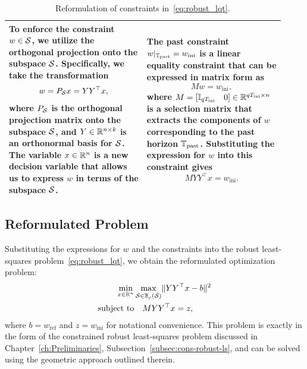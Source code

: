 \begin{table}[h]
    \centering
    \begin{tabular}{p{0.46\linewidth} p{0.46\linewidth}}
        To enforce the constraint $w \in \mathcal{S}$, we utilize the orthogonal projection onto the subspace $\mathcal{S}$. Specifically, we take the transformation
        \begin{equation}
            w = P_{\mathcal{S}} x = YY^\top x,
        \end{equation}
        where $P_{\mathcal{S}}$ is the orthogonal projection matrix onto the subspace $\mathcal{S}$, and $Y \in \mathbb{R}^{n \times k}$ is an orthonormal basis for $\mathcal{S}$. The variable $x \in \mathbb{R}^n$ is a new decision variable that allows us to express $w$ in terms of the subspace $\mathcal{S}$. & The past constraint $w|_{\mathbb{T}_{\textrm{past}}} = w_{\textrm{ini}}$ is a linear equality constraint that can be expressed in matrix form as
        \begin{equation}
            M w = w_{\textrm{ini}},
        \end{equation}
        where $M = [\mathbb{I}_{q T_{\textrm{ini}}} \quad 0] \in \mathbb{R}^{q T_{\textrm{ini}} \times n}$ is a selection matrix that extracts the components of $w$ corresponding to the past horizon $\mathbb{T}_{\textrm{past}}$.
        Substituting the expression for $w$ into this constraint gives
        \begin{equation}
            M YY^\top x = w_{\textrm{ini}}.
        \end{equation} \\
        \hline
    \end{tabular}
    \caption{Reformulation of constraints in~\eqref{eq:robust_lqt}.}
    \label{tab:constraints_reformulation}
\end{table}

\subsection{Reformulated Problem}
Substituting the expressions for $w$ and the constraints into the robust least-squares problem~\eqref{eq:robust_lqt}, we obtain the reformulated optimization problem:
\begin{equation}\label{eq:reformulated_robust_lqt}
    \begin{split}
    \min_{x \in \mathbb{R}^n} & \max_{\mathcal{S} \in \mathbb{B}_{\rho}(\hat{\mathcal{S}})} \lVert YY^\top x - b \rVert^2 \\
    \text{subject to} & \quad M YY^\top x = z,
    \end{split}
\end{equation}
where $b = w_{\textrm{ref}}$ and $z = w_{\textrm{ini}}$ for notational convenience. This problem is exactly in the form of the constrained robust least-squares problem discussed in Chapter~\ref{ch:Preliminaries}, Subsection~\ref{subsec:cons-robust-ls}, and can be solved using the geometric approach outlined therein.

